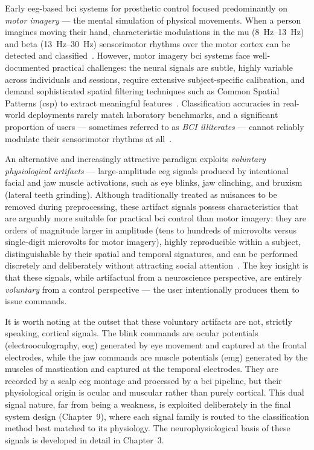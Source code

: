 Early \acrshort{eeg}-based \acrshort{bci} systems for prosthetic
control focused predominantly on \textit{motor imagery} --- the
mental simulation of physical movements. When a person imagines
moving their hand, characteristic modulations in the mu
(\SIrange{8}{13}{\hertz}) and beta (\SIrange{13}{30}{\hertz})
sensorimotor rhythms over the motor cortex can be detected and
classified~\cite{pfurtscheller1999erd}. However, motor imagery
\acrshort{bci} systems face well-documented practical
challenges: the neural signals are subtle, highly variable across
individuals and sessions, require extensive subject-specific
calibration, and demand sophisticated spatial filtering techniques
such as Common Spatial Patterns (\acrshort{csp}) to extract
meaningful features~\cite{blankertz2008csp}. Classification accuracies
in real-world deployments rarely match laboratory benchmarks, and a
significant proportion of users — sometimes referred to as
\textit{BCI illiterates} — cannot reliably modulate their sensorimotor
rhythms at all~\cite{vidaurre2010bci}.

An alternative and increasingly attractive paradigm exploits
\textit{voluntary physiological artifacts} — large-amplitude
\acrshort{eeg} signals produced by intentional facial and jaw muscle
activations, such as eye blinks, jaw clinching, and bruxism (lateral
teeth grinding). Although traditionally treated as nuisances to be
removed during preprocessing, these artifact signals possess
characteristics that are arguably more suitable for practical
\acrshort{bci} control than motor imagery: they are orders of
magnitude larger in amplitude (tens to hundreds of microvolts versus
single-digit microvolts for motor imagery), highly reproducible within
a subject, distinguishable by their spatial and temporal signatures,
and can be performed discretely and deliberately without attracting
social attention~\cite{usakli2010artifact}. The key insight is that
these signals, while artifactual from a neuroscience perspective, are
entirely \textit{voluntary} from a control perspective — the user
intentionally produces them to issue commands.

It is worth noting at the outset that these voluntary artifacts are
not, strictly speaking, cortical signals. The blink commands are
ocular potentials (electrooculography, \acrshort{eog}) generated by
eye movement and captured at the frontal electrodes, while the jaw
commands are muscle potentials (\acrshort{emg}) generated by the
muscles of mastication and captured at the temporal electrodes. They
are recorded by a scalp \acrshort{eeg} montage and processed by a
\acrshort{bci} pipeline, but their physiological origin is ocular and
muscular rather than purely cortical. This dual signal nature, far
from being a weakness, is exploited deliberately in the final system
design (Chapter~9), where each signal family is routed to the
classification method best matched to its physiology. The
neurophysiological basis of these signals is developed in detail in
Chapter~3.

